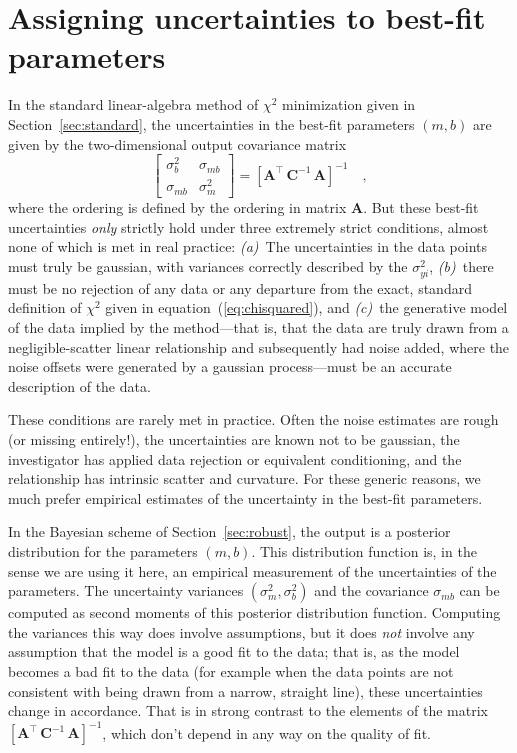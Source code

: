 \documentclass[12pt]{article}
\newcommand{\sectionname}{Section}
\newcommand{\equationname}{equation}
\newcommand{\mmatrix}[1]{\boldsymbol{#1}}
\newcommand{\inverse}[1]{{#1}^{-1}}
\newcommand{\transpose}[1]{{#1}^{\scriptscriptstyle \top}}
\newcommand{\mA}{\mmatrix{A}}
\newcommand{\mAT}{\transpose{\mA}}
\newcommand{\mC}{\mmatrix{C}}
\newcommand{\mCinv}{\inverse{\mC}}
\begin{document}
\section{Assigning uncertainties to best-fit parameters}\label{sec:uncertainty}

In the standard linear-algebra method of $\chi^2$ minimization given
in \sectionname~\ref{sec:standard}, the uncertainties in the best-fit
parameters $(m,b)$ are given by the two-dimensional output covariance
matrix
\begin{equation}
\left[\begin{array}{cc}
\sigma_{b}^2 & \sigma_{mb} \\
\sigma_{mb} & \sigma_{m}^2
\end{array}\right] = \inverse{\left[\mAT\,\mCinv\,\mA\right]} \quad ,
\end{equation}
where the ordering is defined by the ordering in matrix $\mA$.  But
these best-fit uncertainties \emph{only} strictly hold under three
extremely strict conditions, almost none of which is met in real
practice: \textsl{(a)}~The uncertainties in the data points must truly
be gaussian, with variances correctly described by the
$\sigma_{yi}^2$, \textsl{(b)}~there must be no rejection of any data
or any departure from the exact, standard definition of $\chi^2$ given
in \equationname~(\ref{eq:chisquared}), and \textsl{(c)}~the
generative model of the data implied by the method---that is, that the
data are truly drawn from a negligible-scatter linear relationship and
subsequently had noise added, where the noise offsets were generated
by a gaussian process---must be an accurate description of the data.

These conditions are rarely met in practice.  Often the noise
estimates are rough (or missing entirely!), the uncertainties are
known not to be gaussian, the investigator has applied data rejection
or equivalent conditioning, and the relationship has intrinsic scatter
and curvature.  For these generic reasons, we much prefer empirical
estimates of the uncertainty in the best-fit parameters.

In the Bayesian scheme of \sectionname~\ref{sec:robust}, the output is
a posterior distribution for the parameters $(m,b)$.  This
distribution function is, in the sense we are using it here, an
empirical measurement of the uncertainties of the parameters.  The
uncertainty variances $(\sigma_m^2,\sigma_b^2)$ and the covariance
$\sigma_{mb}$ can be computed as second moments of this posterior
distribution function.  Computing the variances this way does involve
assumptions, but it does \emph{not} involve any assumption that the
model is a good fit to the data; that is, as the model becomes a bad
fit to the data (for example when the data points are not consistent
with being drawn from a narrow, straight line), these uncertainties
change in accordance.  That is in strong contrast to the elements of
the matrix $\inverse{\left[\mAT\,\mCinv\,\mA\right]}$, which don't
depend in any way on the quality of fit.
\end{document}
